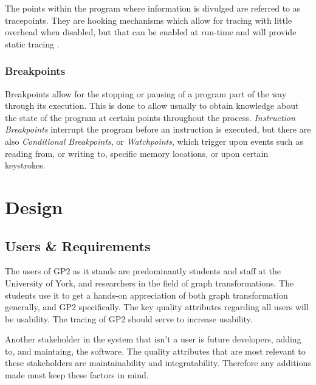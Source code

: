 \documentclass{UoYCSproject}
\begin{document}
The points within the program where information is divulged are referred to as tracepoints. They are hooking mechanisms which allow for tracing with little overhead when disabled, but that can be enabled at run-time and will provide static tracing \cite{tracing_book}.

\subsection{Breakpoints}
Breakpoints allow for the stopping or pausing of a program part of the way through its execution. This is done to allow usually to obtain knowledge about the state of the program at certain points throughout the process. \emph{Instruction Breakpoints} interrupt the program before an instruction is executed, but there are also \emph{Conditional Breakpoints}, or \emph{Watchpoints}, which trigger upon events such as reading from, or writing to, specific memory locations, or upon certain keystrokes.




\chapter{Design}
\section{Users \& Requirements}

The users of GP2 as it stands are predominantly students and staff at the University of York, and researchers in the field of graph transformations. The students use it to get a hands-on appreciation of both graph transformation generally, and GP2 specifically. The key quality attributes regarding all users will be usability. The tracing of GP2 should serve to increase usability. 

Another stakeholder in the system that isn't a user is future developers, adding to, and maintaing, the software. The quality attributes that are most relevant to these stakeholders are maintainability and integratability. Therefore any additions made must keep these factors in mind.
\end{document}
